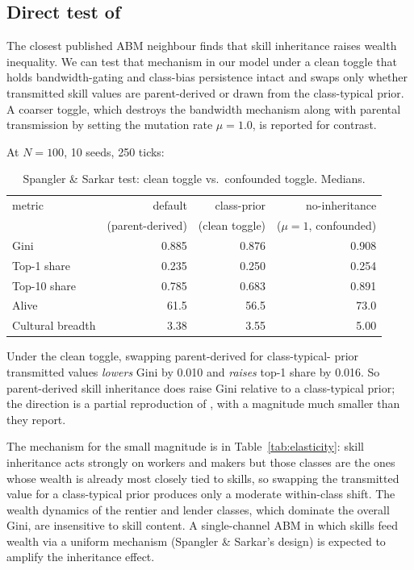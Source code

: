 \documentclass[11pt]{article}
\begin{document}
\subsection{Direct test of \citet{spangler2022distribution}}
\label{sec:spangler}

The closest published ABM neighbour finds that skill inheritance
raises wealth inequality. We can test that mechanism in our model
under a clean toggle that holds bandwidth-gating and class-bias
persistence intact and swaps only whether transmitted skill values
are parent-derived or drawn from the class-typical prior. A coarser
toggle, which destroys the bandwidth mechanism along with parental
transmission by setting the mutation rate $\mu = 1.0$, is reported
for contrast.

At $N = 100$, 10 seeds, 250 ticks:

\begin{table}[h]
\centering
\small
\caption{Spangler \& Sarkar test: clean toggle vs.\ confounded
toggle. Medians.}
\label{tab:spangler}
\begin{tabular}{lrrr}
\toprule
metric & default & class-prior & no-inheritance \\
       & (parent-derived) & (clean toggle) & ($\mu = 1$, confounded) \\
\midrule
Gini             & 0.885 & 0.876 & 0.908 \\
Top-1 share      & 0.235 & 0.250 & 0.254 \\
Top-10 share     & 0.785 & 0.683 & 0.891 \\
Alive            & 61.5  & 56.5  & 73.0 \\
Cultural breadth & 3.38  & 3.55  & 5.00 \\
\bottomrule
\end{tabular}
\end{table}

Under the clean toggle, swapping parent-derived for class-typical-
prior transmitted values \emph{lowers} Gini by 0.010 and \emph{raises}
top-1 share by 0.016. So parent-derived skill inheritance does raise
Gini relative to a class-typical prior; the direction is a partial
reproduction of \citet{spangler2022distribution}, with a magnitude
much smaller than they report.

The mechanism for the small magnitude is in
Table~\ref{tab:elasticity}: skill inheritance acts strongly on
workers and makers but those classes are the ones whose wealth is
already most closely tied to skills, so swapping the transmitted
value for a class-typical prior produces only a moderate
within-class shift. The wealth dynamics of the rentier and lender
classes, which dominate the overall Gini, are insensitive to skill
content. A single-channel ABM in which skills feed wealth via a
uniform mechanism (Spangler \& Sarkar's design) is expected to
amplify the inheritance effect.
\end{document}

